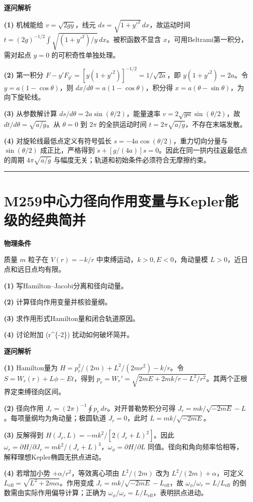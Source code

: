 \documentclass[UTF8,a4paper,11pt,oneside,openany]{ctexbook}
\begin{document}
\par\medskip\noindent\textbf{逐问解析}
\par\noindent\textbf{(1)} 机械能给 \(v=\sqrt{2gy}\)，线元 \(ds=\sqrt{1+y'^2}\,dx\)，故运动时间 \(t=(2g)^{-1/2}\int\sqrt{(1+y'^2)/y}\,dx\)。被积函数不显含 \(x\)，可用Beltrami第一积分，需对起点 \(y=0\) 的可积奇性单独处理。
\par\noindent\textbf{(2)} 第一积分 \(F-y'F_{y'}=[y(1+y'^2)]^{-1/2}=1/\sqrt{2a}\)，即 \(y(1+y'^2)=2a\)。令 \(y=a(1-\cos\theta)\)，则 \(dx/d\theta=a(1-\cos\theta)\)，积分得 \(x=a(\theta-\sin\theta)\)，为向下旋轮线。
\par\noindent\textbf{(3)} 从参数解计算 \(ds/d\theta=2a\sin(\theta/2)\)，能量速率 \(v=2\sqrt{ga}\sin(\theta/2)\)，故 \(dt/d\theta=\sqrt{a/g}\)。从 \(\theta=0\) 到 \(2\pi\) 的全拱运动时间 \(t=2\pi\sqrt{a/g}\)，不存在末端发散。
\par\noindent\textbf{(4)} 对旋轮线最低点定义有符号弧长 \(s=-4a\cos(\theta/2)\)，重力切向分量与 \(\sin(\theta/2)\) 成正比，严格得到 \(\ddot s+[g/(4a)]s=0\)。因此在同一拱内往返最低点的周期 \(4\pi\sqrt{a/g}\) 与幅度无关；轨道和初始条件必须符合无摩擦约束。

\par\bigskip\hrule\bigskip
\section*{M259\quad 中心力径向作用变量与Kepler能级的经典简并}
\textbf{物理条件}\par 质量 \(m\) 粒子在 \(V(r)=-k/r\) 中束缚运动，\(k>0,E<0\)，角动量模 \(L>0\)，近日点和远日点均有限。
\par\noindent\textbf{(1)} 写Hamilton–Jacobi分离和径向动量。
\par\noindent\textbf{(2)} 计算径向作用变量并核验量纲。
\par\noindent\textbf{(3)} 求作用形式Hamilton量和闭合轨道原因。
\par\noindent\textbf{(4)} 讨论附加 (r\textasciicircum{}\{-2\}) 扰动如何破坏简并。

\par\medskip\noindent\textbf{逐问解析}
\par\noindent\textbf{(1)} Hamilton量为 \(H=p_r^2/(2m)+L^2/(2mr^2)-k/r\)。令 \(S=W_r(r)+L\phi-Et\)，得到 \(p_r=W_r'=\sqrt{2mE+2mk/r-L^2/r^2}\)。其两个正根界定束缚径向区间。
\par\noindent\textbf{(2)} 径向作用 \(J_r=(2\pi)^{-1}\oint p_r\,dr\)。对开普勒势积分可得 \(J_r=mk/\sqrt{-2mE}-L\)。每项量纲均为角动量；极圆轨道 \(J_r=0\)，此时 \(L=mk/\sqrt{-2mE}\)。
\par\noindent\textbf{(3)} 反解得到 \(H(J_r,L)=-mk^2/[2(J_r+L)^2]\)。因此 \(\omega_r=\partial H/\partial J_r=mk^2/(J_r+L)^3\)，\(\omega_\phi=\partial H/\partial L\) 同值。径向和角向频率恰相等，解释理想Kepler椭圆无拱点进动。
\par\noindent\textbf{(4)} 若增加小势 \(+\alpha/r^2\)，等效离心项由 \(L^2/(2m)\) 改为 \(L^2/(2m)+\alpha\)，可定义 \(L_{\mathrm{eff}}=\sqrt{L^2+2m\alpha}\)。作用变成 \(J_r=mk/\sqrt{-2mE}-L_{\mathrm{eff}}\)，故 \(\omega_\phi/\omega_r=L/L_{\mathrm{eff}}\) 的倒数需由实际作用偏导计算；正确为 \(\omega_\phi/\omega_r=L/L_{\mathrm{eff}}\)，表明拱点进动。
\end{document}
